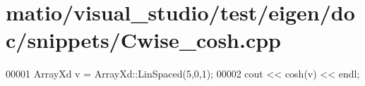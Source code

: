 \hypertarget{matio_2visual__studio_2test_2eigen_2doc_2snippets_2_cwise__cosh_8cpp_source}{}\section{matio/visual\+\_\+studio/test/eigen/doc/snippets/\+Cwise\+\_\+cosh.cpp}
\label{matio_2visual__studio_2test_2eigen_2doc_2snippets_2_cwise__cosh_8cpp_source}

\begin{DoxyCode}
00001 ArrayXd v = ArrayXd::LinSpaced(5,0,1);
00002 cout << cosh(v) << endl;
\end{DoxyCode}
